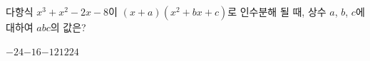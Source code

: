 다항식 $x^3+x^2-2x-8$이 $(x+a)(x^2+bx+c)$로 인수분해 될 때, 상수 $a$, $b$, $c$에 대하여 $abc$의 값은?
\begin{choices32}{$-24$}{$-16$}{$-12$}{$12$}{$24$}\end{choices32}
